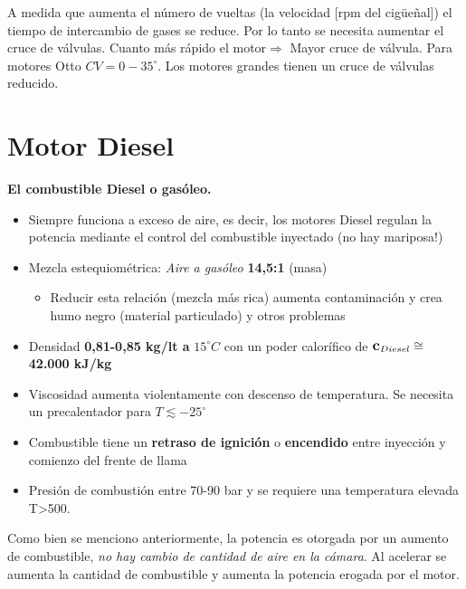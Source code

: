 A medida que aumenta el número de vueltas (la velocidad [rpm del cigüeñal]) el tiempo de intercambio de gases se reduce. Por lo tanto se necesita aumentar el cruce de válvulas. Cuanto más rápido el motor$\Rightarrow$ Mayor cruce de válvula. Para motores Otto $CV=0-35^\circ$. Los motores grandes tienen un cruce de válvulas reducido.

\section{Motor Diesel}

\textbf{El combustible Diesel o gasóleo.} 
\begin{itemize}
    \item Siempre funciona a exceso de aire, es decir, los motores Diesel regulan la potencia mediante el control del combustible inyectado (no hay mariposa!)
    \item Mezcla estequiométrica: \textit{Aire a gasóleo} \textbf{14,5:1} (masa)
    \begin{itemize}
        \item Reducir esta relación (mezcla más rica) aumenta contaminación y crea humo negro (material particulado) y otros problemas
    \end{itemize}
    \item Densidad \textbf{0,81-0,85 kg/lt a }$15^\circ C$ con un poder calorífico de $\mbox{\large$\mathbf{c}$}_{Diesel}\cong$ \textbf{42.000 kJ/kg}
    \item Viscosidad aumenta violentamente con descenso de temperatura. Se necesita un precalentador para $T\lesssim-25^\circ$
    \item Combustible tiene un \textbf{retraso de ignición} o \textbf{encendido} entre inyección y comienzo del frente de llama
    \item Presión de combustión entre 70-90 bar y se requiere una temperatura elevada T>500\grad.
\end{itemize}
Como bien se menciono anteriormente, la potencia es otorgada por un aumento de combustible, \textit{no hay cambio de cantidad de aire en la cámara}. Al acelerar se aumenta la cantidad de combustible y aumenta la potencia erogada por el motor.

